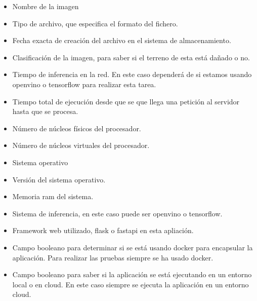 \begin{itemize}
    \item Nombre de la imagen
    \item Tipo de archivo, que especifica el formato del fichero.
    \item Fecha exacta de creación del archivo en el sistema de almacenamiento.
    \item Clasificación de la imagen, para saber si el terreno de esta está dañado o no.
    \item Tiempo de inferencia en la red.
    En este caso dependerá de si estamos usando openvino o tensorflow para realizar esta tarea.
    \item Tiempo total de ejecución desde que se que llega una petición al servidor hasta que se procesa.
    \item Número de núcleos físicos del procesador.
    \item Número de núcleos virtuales del procesador.
    \item Sistema operativo
    \item Versión del sistema operativo.
    \item Memoria ram del sistema.
    \item Sistema de inferencia, en este caso puede ser openvino o tensorflow.
    \item Framework web utilizado, flask o fastapi en esta apliación.
    \item Campo booleano para determinar si se está usando docker para encapsular la aplicación.
    Para realizar las pruebas siempre se ha usado docker.
    \item Campo booleano para saber si la aplicación se está ejecutando en un entorno local o en cloud.
    En este caso siempre se ejecuta la aplicación en un entorno cloud.
\end{itemize}


